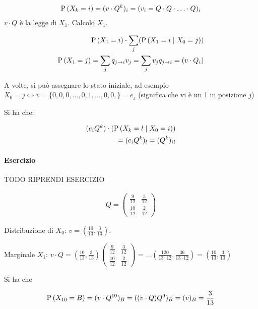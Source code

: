 \[ 
\begin{aligned}
	\text{P}\left(X_k = i\right) = (v \cdot Q^k)_i = (v_i = Q \cdot Q \cdot \hdots \cdot Q)_i
\end{aligned}
 \]
$ v \cdot Q $ è la legge di $ X_1 $. Calcolo $ X_1 $.

\[ \begin{aligned}
\text{P}\left(X_1 = i\right) \cdot \sum_j (\text{P}\left(X_1 = i \mid X_0 = j\right)) \\
\text{P}\left(X_1 = j\right) = \sum_j q_{j \to i} v_j = \sum_j v_j q_{j \to i} = (v \cdot Q_i)
\end{aligned} \]


A volte, si può assegnare lo stato iniziale, ad esempio $ X_0 = j \iff v = \{0, 0, 0, \hdots, 0, 1, \hdots, 0, 0,\} = e_j $ (significa che vi è un 1 in posizione $ j $) 

Si ha che:

\[ \begin{aligned}
(e_i Q^k) \cdot (\text{P}\left(X_k = l \mid X_0 = i\right) ) \\ 
= (e_i Q^k)_l = (Q^k)_{il}
\end{aligned} \]

\paragraph{Esercizio}

TODO RIPRENDI ESERCIZIO 

\[ \begin{aligned}
Q=\begin{pmatrix}
\frac{9}{12} & \frac{3}{12} \\
\frac{10}{12} & \frac{2}{12}
\end{pmatrix}
\end{aligned} \]

Distribuzione di $ X_0 $: $ v = (\frac{10}{13}, \frac{3}{13}) $.

Marginale $ X_1 $: $ v \cdot Q = (\frac{10}{13}, \frac{3}{13})\begin{pmatrix}
\frac{9}{12} & \frac{3}{12} \\
\frac{10}{12} & \frac{2}{12}
\end{pmatrix} $ = $\hdots (\frac{120}{13 \cdot 12}, \frac{36}{13 \cdot 12}) = \left( \frac{10}{13}, \frac{3}{13} \right)$

Si ha che 

\[ \begin{aligned}
\text{P}\left(X_{10} = B\right) = (v \cdot Q^{10})_B = ((v \cdot Q) Q^9)_B = (v)_B = {\dfrac{3}{13}} 
\end{aligned} \]

